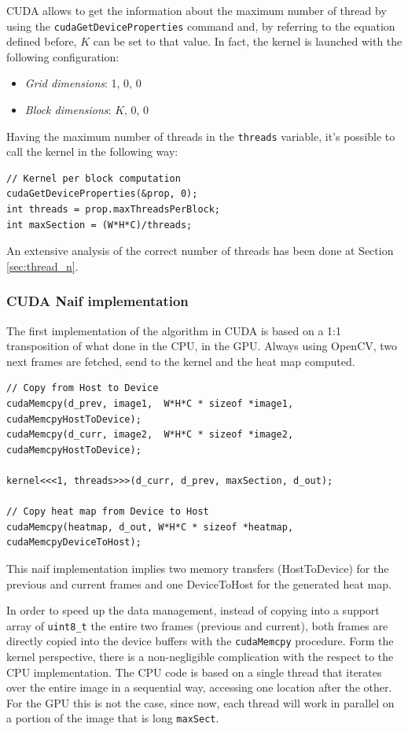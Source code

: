 \documentclass[paper=a4, fontsize=10pt]{scrartcl}	%
\begin{document}
	CUDA allows to get the information about the maximum number of thread by using the \texttt{cudaGetDeviceProperties} command and, by referring to the equation defined before, $K$ can be set to that value. In fact, the kernel is launched with the following configuration:
	\begin{itemize}
		\itemsep0sp
		\item \textit{Grid dimensions}:  1, 0, 0
		\item \textit{Block dimensions}: $K$, 0, 0
	\end{itemize}
	Having the maximum number of threads in the \texttt{threads} variable, it's possible to call the kernel in the following way:
	\begin{lstlisting}[style=CStyle]
// Kernel per block computation
cudaGetDeviceProperties(&prop, 0);
int threads = prop.maxThreadsPerBlock;
int maxSection = (W*H*C)/threads;\end{lstlisting}
	
	An extensive analysis of the correct number of threads has been done at Section \ref{sec:thread_n}.

	\subsubsection{CUDA Naif implementation}
	The first implementation of the algorithm in CUDA is based on a 1:1 transposition of what done in the CPU, in the GPU. Always using OpenCV, two next frames are fetched, send to the kernel and the heat map computed.
	
	\begin{lstlisting}[style=CStyle]
// Copy from Host to Device
cudaMemcpy(d_prev, image1,  W*H*C * sizeof *image1, cudaMemcpyHostToDevice);
cudaMemcpy(d_curr, image2,  W*H*C * sizeof *image2, cudaMemcpyHostToDevice);

kernel<<<1, threads>>>(d_curr, d_prev, maxSection, d_out);

// Copy heat map from Device to Host
cudaMemcpy(heatmap, d_out, W*H*C * sizeof *heatmap, cudaMemcpyDeviceToHost);\end{lstlisting}

	This naif implementation implies two memory transfers (HostToDevice) for the previous and current frames and one DeviceToHost for the generated heat map.
	
	
	In order to speed up the data management, instead of copying into a support array of \texttt{uint8\_t} the entire two frames (previous and current), both frames are directly copied into the device buffers with the \texttt{cudaMemcpy} procedure.\newline\newline
	Form the kernel perspective, there is a non-negligible complication with the respect to the CPU implementation. The CPU code is based on a single thread that iterates over the entire image in a sequential way, accessing one location after the other. For the GPU this is not the case, since now, each thread will work in parallel on a portion of the image that is long \texttt{maxSect}.
	
\end{document}
